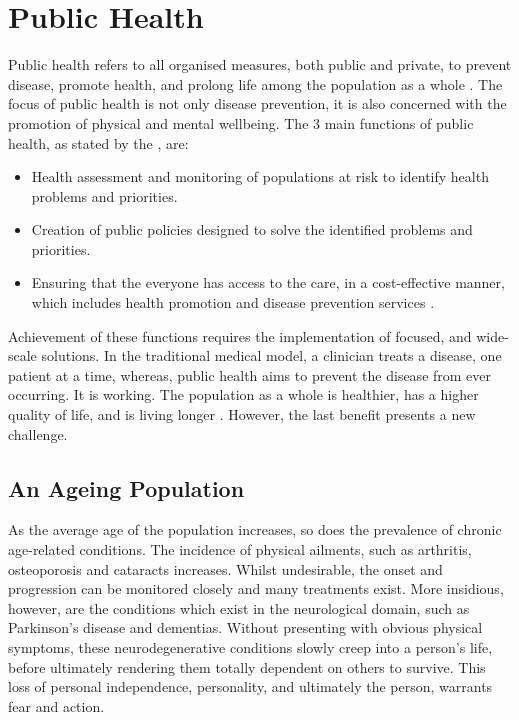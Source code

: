  \label{chapter: introduction}

\section{Public Health}
Public health refers to all organised measures, both public and private, to prevent disease, promote health, and prolong life among the population as a whole \cite{WorldHealthOrganisation2016}.
The focus of public health is not only disease prevention, it is also concerned with the promotion of physical and mental wellbeing. The 3 main functions of public health, as stated by the \citeauthor{WorldHealthOrganisation2016} , are:

\begin{itemize}
	\item Health assessment and monitoring of populations at risk to identify health problems and priorities.
	\item Creation of public policies designed to solve the identified problems and priorities.
	\item Ensuring that the everyone has access to the care, in a cost-effective manner, which includes health promotion and disease prevention services \cite{WorldHealthOrganisation2016}.
\end{itemize}

Achievement of these functions requires the implementation of focused, and wide-scale solutions. In the traditional medical model, a clinician treats a disease, one patient at a time, whereas, public health aims to prevent the disease from ever occurring. It is working. The population as a whole is healthier, has a higher quality of life, and is living longer \cite{Uhlenberg2009}. However, the last benefit presents a new challenge.

\subsection{An Ageing Population}
As the average age of the population increases, so does the prevalence of chronic age-related conditions. The incidence of physical ailments, such as arthritis, osteoporosis and cataracts increases. Whilst undesirable, the onset and progression can be monitored closely and many treatments exist. More insidious, however, are the conditions which exist in the neurological domain, such as Parkinson's disease and dementias. Without presenting with obvious physical symptoms, these neurodegenerative conditions slowly creep into a person's life, before ultimately rendering them totally dependent on others to survive. This loss of personal independence, personality, and ultimately the person, warrants fear and action.

